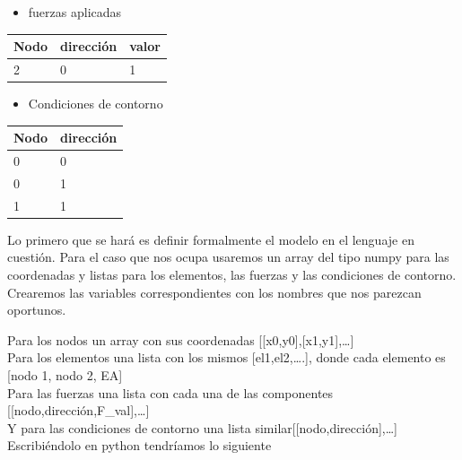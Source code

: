 \documentclass[11pt]{article}
\providecommand{\tightlist}{%
      \setlength{\itemsep}{0pt}\setlength{\parskip}{0pt}}
\begin{document}
\begin{itemize}
\tightlist
\item
  fuerzas aplicadas
\end{itemize}

\begin{longtable}[]{@{}lll@{}}
\toprule
Nodo & dirección & valor\tabularnewline
\midrule
\endhead
2 & 0 & 1\tabularnewline
\bottomrule
\end{longtable}

\begin{itemize}
\tightlist
\item
  Condiciones de contorno
\end{itemize}

\begin{longtable}[]{@{}ll@{}}
\toprule
Nodo & dirección\tabularnewline
\midrule
\endhead
0 & 0\tabularnewline
0 & 1\tabularnewline
1 & 1\tabularnewline
\bottomrule
\end{longtable}

Lo primero que se hará es definir formalmente el modelo en el lenguaje
en cuestión. Para el caso que nos ocupa usaremos un array del tipo numpy
para las coordenadas y listas para los elementos, las fuerzas y las
condiciones de contorno. Crearemos las variables correspondientes con
los nombres que nos parezcan oportunos.

    Para los nodos un array con sus coordenadas
{[}{[}x0,y0{]},{[}x1,y1{]},\ldots{]}\\
Para los elementos una lista con los mismos {[}el1,el2,\ldots.{]}, donde
cada elemento es {[}nodo 1, nodo 2, EA{]}\\
Para las fuerzas una lista con cada una de las componentes
{[}{[}nodo,dirección,F\_val{]},\ldots{]}\\
Y para las condiciones de contorno una lista
similar{[}{[}nodo,dirección{]},\ldots{]}\\
Escribiéndolo en python tendríamos lo siguiente
\end{document}
